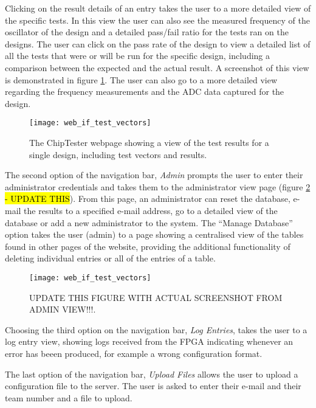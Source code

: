 Clicking on the result details of an entry takes the user to a more detailed view of the specific tests. In this view the user can also see the measured frequency of the oscillator of the design and a detailed pass/fail ratio for the tests ran on the designs. The user can click on the pass rate of the design to view a detailed list of all the tests that were or will be run for the specific design, including a comparison between the expected and the actual result. A screenshot of this view is demonstrated in figure \ref{fig:web_if_test_vectors}. The user can also go to a more detailed view regarding the frequency measurements and the ADC data captured for the design.

\begin{figure}[ht]
 \centering
 \texttt{[image: web\_if\_test\_vectors]}
 \caption{The ChipTester webpage showing a view of the test results for a single design, including test vectors and results.}
 \label{fig:web_if_test_vectors}
\end{figure}

The second option of the navigation bar, \textit{Admin} prompts the user to enter their administrator credentials and takes them to the administrator view page (figure \ref{fig:web_if_admin}\hl{ - UPDATE THIS}). From this page, an administrator can reset the database, e-mail the results to a specified e-mail address, go to a detailed view of the database or add a new administrator to the system. The ``Manage Database'' option takes the user (admin) to a page showing a centralised view of the tables found in other pages of the website, providing the additional functionality of deleting individual entries or all of the entries of a table.

\begin{figure}[ht]
 \centering
 \texttt{[image: web\_if\_test\_vectors]}
 \caption{UPDATE THIS FIGURE WITH ACTUAL SCREENSHOT FROM ADMIN VIEW!!!.}
 \label{fig:web_if_admin}
\end{figure}

Choosing the third option on the navigation bar, \textit{Log Entries}, takes the user to a log entry view, showing logs received from the FPGA indicating whenever an error has beeen produced, for example a wrong configuration format.

The last option of the navigation bar, \textit{Upload Files} allows the user to upload a configuration file to the server. The user is asked to enter their e-mail and their team number and a file to upload.

